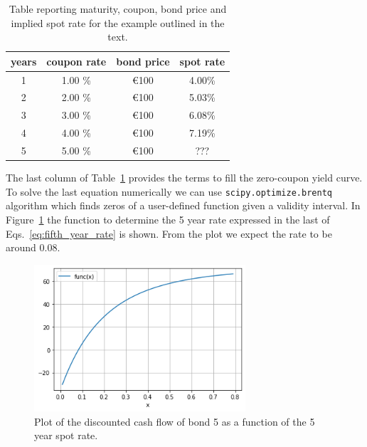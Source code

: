 \begin{table}[htb]
\begin{center}
\begin{tabular}{|c|c|c|c|}
\hline
\textbf{years} & \textbf{coupon rate} & \textbf{bond price} & \textbf{spot rate} \\
\hline
1 & 1.00 \% & \euro{100} & 4.00\% \\
\hline
2 & 2.00 \% & \euro{100} & 5.03\% \\
\hline
3 & 3.00 \% & \euro{100} & 6.08\% \\
\hline
4 & 4.00 \% & \euro{100} & 7.19\% \\
\hline
5 & 5.00 \% & \euro{100} & ??? \\
\hline
\end{tabular}
\end{center}
\caption{Table reporting maturity, coupon, bond price and implied spot rate for the example outlined in the text.}
\label{tab:rates}
\end{table}
The last column of Table~\ref{tab:rates} provides the terms to fill the zero-coupon yield curve.
To solve the last equation numerically we can use \texttt{scipy.optimize.brentq} algorithm which finds zeros of a user-defined function given a validity interval.
In Figure~\ref{fig:fifth_year_rate} the function to determine the 5 year rate expressed in the last of Eqs.~\ref{eq:fifth_year_rate} is shown. From the plot we expect the rate to be around 0.08.

\begin{figure}[htb]
  \centering
  \includegraphics[width=0.7\textwidth]{figures/bond_5_plot.png}
  \caption{Plot of the discounted cash flow of bond 5 as a function of the 5 year spot rate.}
  \label{fig:fifth_year_rate}
\end{figure}


